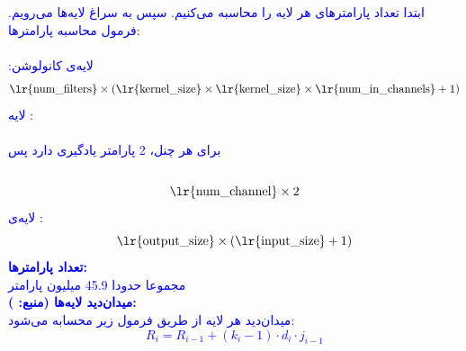 \documentclass[12pt]{article}
\begin{document}
\begin{enumerate}
    \textcolor{blue}{
    ابتدا تعداد پارامترهای هر لایه را محاسبه می‌کنیم. سپس به سراغ   لایه‌ها می‌رویم. فرمول محاسبه پارامترها:\\\\
    لایه‌ی کانولوشن:
    $$\text{\lr{num\_filters}} \times (\text{\lr{kernel\_size}} \times \text{\lr{kernel\_size}} \times \text{\lr{num\_in\_channels}} + 1)$$
    لایه :\\\\
     برای هر چنل، 2 پارامتر یادگیری دارد پس\\\\ 
    $$\text{\lr{num\_channel}} \times 2$$
    لایه‌ی :\\
    $$\text{\lr{output\_size}} \times (\text{\lr{input\_size}} + 1)$$
    \textbf{تعداد پارامترها:}\\
    مجموعا حدودا 45.9 میلیون پارامتر \\
    \textbf{میدان‌دید لایه‌ها (منبع:  ):}\\
    میدان‌دید هر لایه از طریق فرمول زیر محسابه می‌شود:
    $$
    R_i = R_{i-1} + (k_i - 1) \cdot d_{i} \cdot j_{i-1}
$$}
\end{enumerate}
\end{document}
